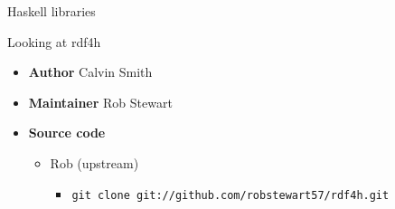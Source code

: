 \documentclass{beamer}
\begin{document}
\begin{frame}[fragile]

\huge
\begin{center}
Haskell libraries
\end{center}

\large
\begin{center}
Looking at rdf4h
\end{center}

\begin{itemize}
\item \textbf{Author} Calvin Smith
\item \textbf{Maintainer} Rob Stewart
\item \textbf{Source code}
  
  \begin{itemize}
  \item Rob (upstream)
    
    \begin{itemize}
    \item \texttt{git clone git://github.com/robstewart57/rdf4h.git}
    \end{itemize}
    
  \end{itemize}

\end{itemize}

\end{frame}
\end{document}
